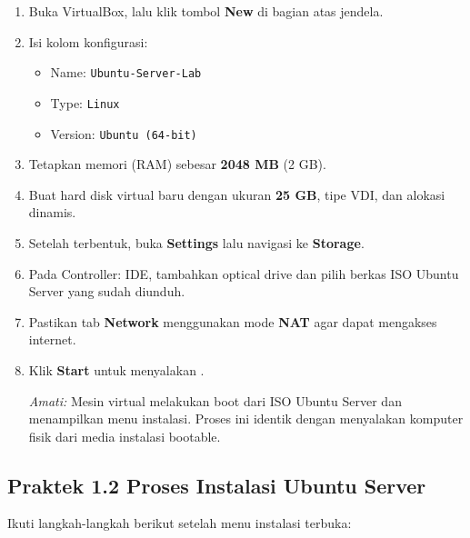 \begin{enumerate}
    \item Buka VirtualBox, lalu klik tombol \textbf{New} di bagian atas jendela.
    \item Isi kolom konfigurasi:
    \begin{itemize}
        \item Name: \texttt{Ubuntu-Server-Lab}
        \item Type: \texttt{Linux}
        \item Version: \texttt{Ubuntu (64-bit)}
    \end{itemize}
    \item Tetapkan memori (RAM) sebesar \textbf{2048 MB} (2 GB).
    \item Buat hard disk virtual baru dengan ukuran \textbf{25 GB}, tipe VDI, dan
    alokasi dinamis.
    \item Setelah  terbentuk, buka \textbf{Settings} lalu navigasi ke
    \textbf{Storage}.
    \item Pada Controller: IDE, tambahkan optical drive dan pilih berkas ISO Ubuntu
    Server yang sudah diunduh.
    \item Pastikan tab \textbf{Network} menggunakan mode \textbf{NAT} agar 
    dapat mengakses internet.
    \item Klik \textbf{Start} untuk menyalakan .

    \textit{Amati:} Mesin virtual melakukan boot dari ISO Ubuntu Server dan menampilkan
    menu instalasi. Proses ini identik dengan menyalakan komputer fisik dari media
    instalasi bootable.
\end{enumerate}

\subsection*{Praktek 1.2 Proses Instalasi Ubuntu Server}

Ikuti langkah-langkah berikut setelah menu instalasi terbuka:

